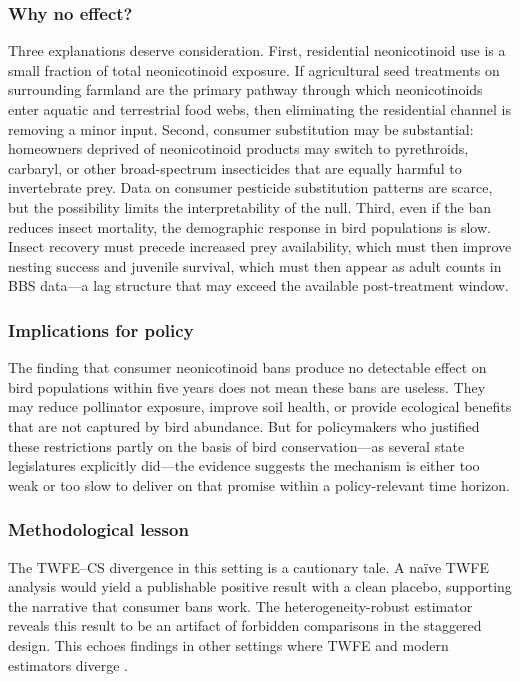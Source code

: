 \documentclass[12pt]{article}
\begin{document}
\subsubsection*{Why no effect?} Three explanations deserve consideration. First, residential neonicotinoid use is a small fraction of total neonicotinoid exposure. If agricultural seed treatments on surrounding farmland are the primary pathway through which neonicotinoids enter aquatic and terrestrial food webs, then eliminating the residential channel is removing a minor input. Second, consumer substitution may be substantial: homeowners deprived of neonicotinoid products may switch to pyrethroids, carbaryl, or other broad-spectrum insecticides that are equally harmful to invertebrate prey. Data on consumer pesticide substitution patterns are scarce, but the possibility limits the interpretability of the null. Third, even if the ban reduces insect mortality, the demographic response in bird populations is slow. Insect recovery must precede increased prey availability, which must then improve nesting success and juvenile survival, which must then appear as adult counts in BBS data---a lag structure that may exceed the available post-treatment window.

\subsubsection*{Implications for policy} The finding that consumer neonicotinoid bans produce no detectable effect on bird populations within five years does not mean these bans are useless. They may reduce pollinator exposure, improve soil health, or provide ecological benefits that are not captured by bird abundance. But for policymakers who justified these restrictions partly on the basis of bird conservation---as several state legislatures explicitly did---the evidence suggests the mechanism is either too weak or too slow to deliver on that promise within a policy-relevant time horizon.

\subsubsection*{Methodological lesson} The TWFE--CS divergence in this setting is a cautionary tale. A na\"ive TWFE analysis would yield a publishable positive result with a clean placebo, supporting the narrative that consumer bans work. The heterogeneity-robust estimator reveals this result to be an artifact of forbidden comparisons in the staggered design. This echoes findings in other settings where TWFE and modern estimators diverge \citep{baker2022much, dechaisemartin2020two, borusyak2024revisiting}.
\end{document}
